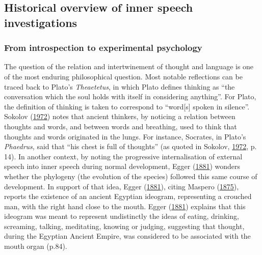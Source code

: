 \documentclass[a4paper,12pt,twoside,onecolumn,openright,final,oldfontcommands]{memoir}
\begin{document}
\hypertarget{inner-speech-history}{%
\subsection{Historical overview of inner speech investigations}\label{inner-speech-history}}

\hypertarget{from-introspection-to-experimental-psychology}{%
\subsubsection{From introspection to experimental psychology}\label{from-introspection-to-experimental-psychology}}

The question of the relation and intertwinement of thought and language is one of the most enduring philosophical question. Most notable reflections can be traced back to Plato's \emph{Theaetetus}, in which Plato defines thinking as \enquote{the conversation which the soul holds with itself in considering anything}. For Plato, the definition of thinking is taken to correspond to \enquote{word{[}s{]} spoken in silence}. Sokolov (\protect\hyperlink{ref-sokolov_inner_1972}{1972}) notes that ancient thinkers, by noticing a relation between thoughts and words, and between words and breathing, used to think that thoughts and words originated in the lungs. For instance, Socrates, in Plato's \emph{Phaedrus}, said that \enquote{his chest is full of thoughts} (as quoted in Sokolov, \protect\hyperlink{ref-sokolov_inner_1972}{1972}, p. 14). In another context, by noting the progressive internalisation of external speech into inner speech during normal development, Egger (\protect\hyperlink{ref-egger_parole_1881}{1881}) wonders whether the phylogeny (the evolution of the species) followed this same course of development. In support of that idea, Egger (\protect\hyperlink{ref-egger_parole_1881}{1881}), citing Maspero (\protect\hyperlink{ref-maspero_histoire_1875}{1875}), reports the existence of an ancient Egyptian ideogram, representing a crouched man, with the right hand close to the mouth. Egger (\protect\hyperlink{ref-egger_parole_1881}{1881}) explains that this ideogram was meant to represent undistinctly the ideas of eating, drinking, screaming, talking, meditating, knowing or judging, suggesting that thought, during the Egyptian Ancient Empire, was considered to be associated with the mouth organ (p.84).
\end{document}
